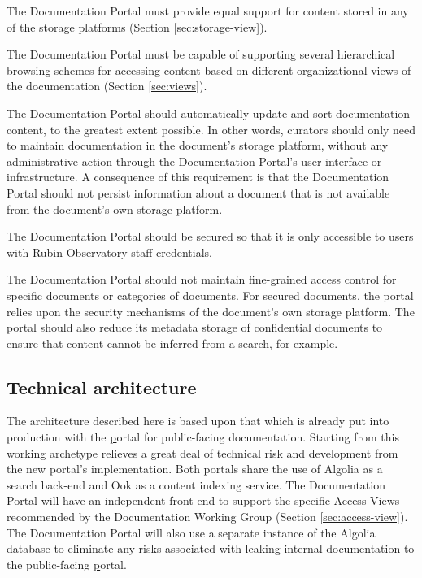 The Documentation Portal must provide equal support for content stored in any of the storage platforms (Section \ref{sec:storage-view}).

The Documentation Portal must be capable of supporting several hierarchical browsing schemes for accessing content based on different organizational views of the documentation (Section \ref{sec:views}).

The Documentation Portal should automatically update and sort documentation content, to the greatest extent possible.
  In other words, curators should only need to maintain documentation in the document's storage platform, without any administrative action through the Documentation Portal's user interface or infrastructure.
  A consequence of this requirement is that the Documentation Portal should not persist information about a document that is not available from the document's own storage platform.

The Documentation Portal should be secured so that it is only accessible to users with Rubin Observatory staff credentials.

The Documentation Portal should not maintain fine-grained access control for specific documents or categories of documents.
  For secured documents, the portal relies upon the security mechanisms of the document's own storage platform.
  The portal should also reduce its metadata storage of confidential documents to ensure that content cannot be inferred from a search, for example.


\subsection{Technical architecture}

The architecture described here is based upon that which is already put into production with the \href{www.lsst.io} portal for public-facing documentation.
Starting from this working archetype relieves a great deal of technical risk and development from the new portal's implementation.
Both portals share the use of Algolia \citep{Algolia-cite} as a search back-end and Ook \citep{ook-cite} as a content indexing service.
The Documentation Portal will have an independent front-end to support the specific Access Views recommended by the Documentation Working Group (Section \ref{sec:access-view}).
The Documentation Portal will also use a separate instance of the Algolia database to eliminate any risks associated with leaking internal documentation to the public-facing \href{www.lsst.io} portal.

